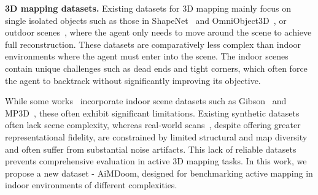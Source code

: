 \noindent \textbf{3D mapping datasets.}
Existing datasets for 3D mapping mainly focus on single isolated objects such as those in ShapeNet~\citep{chang2015shapenet} and OmniObject3D~\citep{wu2023omniobject3d}, or outdoor scenes~\citep{lu2023large, hardouin2020next}, where the agent only needs to move around the scene to achieve full reconstruction.
These datasets are comparatively less complex than indoor environments where the agent must enter into the scene.
The indoor scenes contain unique challenges such as dead ends and tight corners, which often force the agent to backtrack without significantly improving its objective.

While some works~\citep{yan2023active, upen, occant} incorporate indoor scene datasets such as Gibson~\citep{gibson} and MP3D~\citep{Matterport3D}, these often exhibit significant limitations. 
Existing synthetic datasets~\citep{replica19arxiv, RoboTHOR} often lack scene complexity, whereas real-world scans~\citep{dai2017scannet, ramakrishnan2021hm3d}, despite offering greater representational fidelity, are constrained by limited structural and map diversity and often suffer from substantial noise artifacts.
This lack of reliable datasets prevents comprehensive evaluation in active 3D mapping tasks.
In this work, we propose a new dataset - AiMDoom, designed for benchmarking active mapping in indoor environments of different complexities. 






